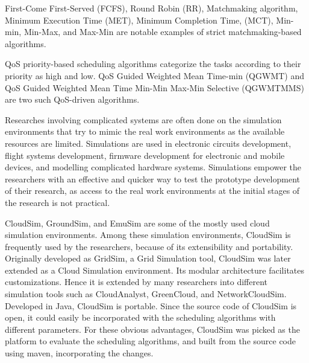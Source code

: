 \documentclass[times, 10pt,twocolumn]{article}
\begin{document}
First-Come First-Served (FCFS), Round Robin (RR), Matchmaking algorithm, Minimum Execution Time (MET), Minimum Completion Time, (MCT), Min-min, Min-Max, and Max-Min are notable examples of strict matchmaking-based algorithms. 

QoS priority-based scheduling algorithms categorize the tasks according to their priority as high and low. QoS Guided Weighted Mean Time-min (QGWMT) and QoS Guided Weighted Mean Time Min-Min Max-Min Selective (QGWMTMMS) are two such QoS-driven algorithms. 






Researches involving complicated systems are often done on the simulation environments that try to mimic the real work environments as the available resources are limited. Simulations are used in electronic circuits development, flight systems development, firmware development for electronic and mobile devices, and modelling complicated hardware systems. Simulations empower the researchers with an effective and quicker way to test the prototype development of their research, as access to the real work environments at the initial stages of the research is not practical.

CloudSim, GroundSim, and EmuSim are some of the mostly used cloud simulation environments. Among these simulation environments, CloudSim is frequently used by the researchers, because of its extensibility and portability. Originally developed as GridSim, a Grid Simulation tool, CloudSim was later extended as a Cloud Simulation environment. Its modular architecture facilitates customizations. Hence it is extended by many researchers into different simulation tools such as CloudAnalyst, GreenCloud, and NetworkCloudSim. Developed in Java, CloudSim is portable. Since the source code of CloudSim is open, it could easily be incorporated with the scheduling algorithms with different parameters. For these obvious advantages, CloudSim was picked as the platform to evaluate the scheduling algorithms, and built from the source code using maven, incorporating the changes.
\end{document}
